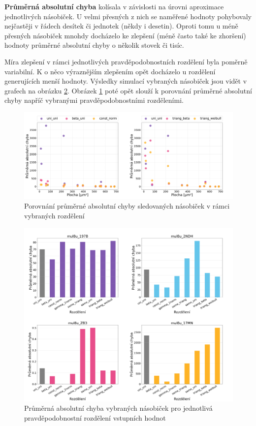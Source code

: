 \textbf{Průměrná absolutní chyba} kolísala v závislosti na úrovni aproximace jednotlivých násobiček. U velmi přesných z nich se naměřené hodnoty pohybovaly nejčastěji v řádech desítek či jednotek (někdy i desetin). Oproti tomu u méně přesných násobiček mnohdy docházelo ke zlepšení (méně často také ke zhoršení) hodnoty průměrné absolutní chyby o několik stovek či tisíc.

Míra zlepšení v rámci jednotlivých pravděpodobnostních rozdělení byla poměrně variabilní. K o něco výraznějším zlepšením opět docházelo u rozdělení generujících menší hodnoty. Výsledky simulací vybraných násobiček jsou vidět v grafech na obrázku \ref{fig:metrics_mean_abs_error}. Obrázek \ref{fig:scatter_mean_abs_error} poté opět slouží k porovnání průměrné absolutní chyby napříč vybranými pravděpodobnostními rozděleními.

\begin{figure}[H]
    \centering
    \includegraphics[width=\textwidth]{obrazky-figures/scatter_mean_abs_error.png}
    \caption{Porovnání průměrné absolutní chyby sledovaných násobiček v rámci vybraných rozdělení}
    \label{fig:scatter_mean_abs_error}
\end{figure}

\begin{figure}[H]
    \centering
    \includegraphics[width=\textwidth]{obrazky-figures/metrics_mean_abs_error.png}
    \caption{Průměrná absolutní chyba vybraných násobiček pro jednotlivá pravděpodobnostní rozdělení vstupních hodnot}
    \label{fig:metrics_mean_abs_error}
\end{figure}

